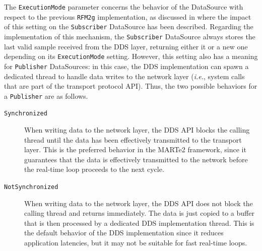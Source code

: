 The \texttt{ExecutionMode} parameter concerns the behavior of the DataSource with respect to the previous \texttt{RFM2g} implementation, as discussed in  where the impact of this setting on the \texttt{Subscriber} DataSource has been described. Regarding the implementation of this mechanism, the \texttt{Subscriber} DataSource always stores the last valid sample received from the DDS layer, returning either it or a new one depending on its \texttt{ExecutionMode} setting. However, this setting also has a meaning for \texttt{Publisher} DataSources: in this case, the DDS implementation can spawn a dedicated thread to handle data writes to the network layer (\emph{i.e.}, system calls that are part of the transport protocol API). Thus, the two possible behaviors for a \texttt{Publisher} are as follows.
\begin{description}
  \item[\texttt{Synchronized}] When writing data to the network layer, the DDS API blocks the calling thread until the data has been effectively transmitted to the transport layer. This is the preferred behavior in the MARTe2 framework, since it guarantees that the data is effectively transmitted to the network before the real-time loop proceeds to the next cycle.
  \item[\texttt{NotSynchronized}] When writing data to the network layer, the DDS API does not block the calling thread and returns immediately. The data is just copied to a buffer that is then processed by a dedicated DDS implementation thread. This is the default behavior of the DDS implementation since it reduces application latencies, but it may not be suitable for fast real-time loops.
\end{description}

